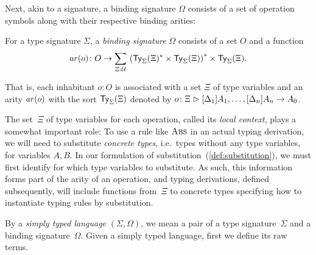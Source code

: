 Next, akin to a signature, a binding signature $\Omega$ consists of a set of operation symbols along with their respective binding arities:
\begin{definition}\label{def:binding-signature}
  For a type signature $\Sigma$, a \emph{binding signature} $\Omega$ consists of a set $O$ and a function
  \[
    \arity(o) \colon O \to \sm{\Xi : \UU} \left(\Type_\Sigma(\Xi)^* \times \Type_\Sigma(\Xi)\right)^* \times \Type_\Sigma(\Xi).
  \]
\end{definition}
That is, each inhabitant $o: O$  is associated with a set $\Xi$ of type variables and an arity $\mathit{ar}(o)$ with the sort $\mathsf{Ty}_{\Sigma}(\Xi)$ denoted by $o\colon \Xi \mathrel{\rhd} [\Delta_{1}]A_{1}, \ldots, [\Delta_{n}]A_{n} \to A_0$.

The set~$\Xi$ of type variables for each operation, called its \emph{local context}, plays a somewhat important role:
To use a rule like $\textnormal{\textsc{Abs}}$ in an actual typing derivation, we will need to substitute \emph{concrete types}, i.e.\ types without any type variables, for variables $A, B$.
In our formulation of substitution~(\cref{def:substitution}), we must first identify for which type variables to substitute.
As such, this information forms part of the arity of an operation, and typing derivations, defined subsequently, will include functions from~$\Xi$ to concrete types specifying how to instantiate typing rules by substitution.

By a \emph{simply typed language} $(\Sigma, \Omega)$, we mean a pair of a type signature~$\Sigma$ and a binding signature~$\Omega$.
Given a simply typed language, first we define its raw terms.

